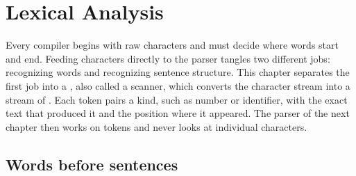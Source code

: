 \chapter{Lexical Analysis}
\label{ch:lexical-analysis}

Every compiler begins with raw characters and must decide where words start and end.
Feeding characters directly to the parser tangles two different jobs: recognizing words and recognizing sentence structure.
This chapter separates the first job into a , also called a scanner, which converts the character stream into a stream of .
Each token pairs a kind, such as number or identifier, with the exact text that produced it and the position where it appeared.
The parser of the next chapter then works on tokens and never looks at individual characters.

\section{Words before sentences}
\label{sec:ch03-words-before-sentences}

